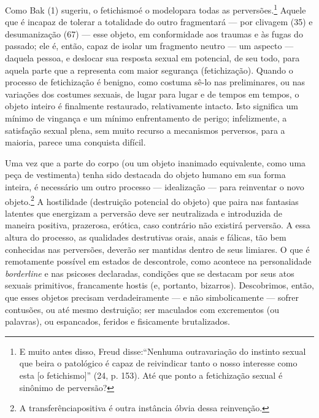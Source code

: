 Como Bak\idxbak{} (1) sugeriu, o fetichismo\idxfetic[|(] é o modelo\idxdesu[|(] para todas as
perversões.\footnote{ E muito antes disso, Freud disse:\idxfreudfetic[|nn]
``Nenhuma outra\idxdesfa[|(] variação do instinto sexual que beira o
patológico é capaz de reivindicar tanto o nosso interesse como esta [o
fetichismo]'' (24, p. 153). Até que ponto a fetichização
sexual é sinônimo de perversão?} Aquele que é incapaz de tolerar a
totalidade do outro fragmentará --- por clivagem\idxcliv{} (35) e
desumanização (67) --- esse objeto, em conformidade aos traumas e às
fugas do passado; ele é, então, capaz de isolar um fragmento neutro
--- um aspecto --- daquela pessoa, e deslocar sua resposta sexual em
potencial, de seu todo, para aquela parte que a representa com maior
segurança (fetichização). Quando o processo de fetichização é benigno,
como costuma sê-lo nas preliminares, ou nas variações dos costumes
sexuais, de lugar para lugar e de tempos em tempos, o objeto inteiro é
finalmente restaurado, relativamente intacto. Isto significa um mínimo
de vingança e um mínimo enfrentamento de perigo; infelizmente, a
satisfação sexual plena, sem muito recurso a mecanismos perversos, para
a maioria, parece uma conquista difícil.

Uma vez que a parte do corpo (ou um objeto inanimado equivalente,
como uma peça de vestimenta)\idxfeminsimb{} tenha sido destacada do objeto humano em
sua forma inteira, é necessário um outro processo --- idealização ---\idxideal{}
para reinventar o novo objeto.\footnote{ A transferência\idxtransf[|nn] positiva é
outra instância óbvia dessa reinvenção.} A hostilidade (destruição
potencial do objeto) que paira nas fantasias latentes que energizam a
perversão deve ser neutralizada e introduzida de maneira positiva,
prazerosa, erótica, caso contrário não existirá perversão. A essa
altura do processo, as qualidades destrutivas orais, anais e fálicas,
tão bem conhecidas nas perversões, deverão ser mantidas dentro de seus
limiares. O que é remotamente possível em estados de descontrole, como
acontece na personalidade \textit{borderline} e nas psicoses\idxpsico{}
declaradas, condições que se destacam por seus atos sexuais primitivos,
francamente hostis (e, portanto, bizarros). Descobrimos, então, que
esses objetos precisam verdadeiramente --- e não simbolicamente ---
sofrer contusões, ou até mesmo destruição; ser maculados com
excrementos (ou palavras), ou espancados, feridos e fisicamente
brutalizados.

